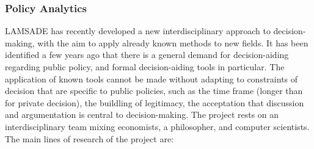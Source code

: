 %
%



%
%
\subsubsection{Policy Analytics}

LAMSADE has recently developed a new interdisciplinary approach to decision-making, with the aim to apply already known methods to new fields. It has been identified a few years ago that there is a general demand for decision-aiding regarding public policy, and formal decision-aiding tools in particular. The application of known tools cannot be made without adapting to constraints of decision that are specific to public policies, such as the time frame (longer than for private decision), the buildling of legitimacy, the acceptation that discussion and argumentation is central to decision-making. The project rests on an interdisciplinary team mixing economists, a philosopher, and computer scientists.
The main lines of research of the project are:

